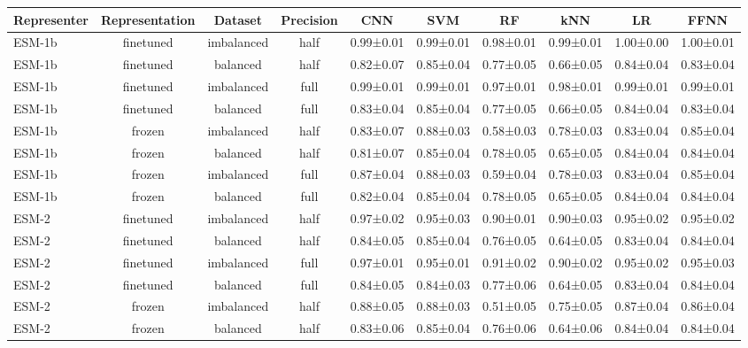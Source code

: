 \begin{tabular}{lccccccccc}
\toprule
 \textbf{Representer} & \textbf{Representation} &    \textbf{Dataset} & \textbf{Precision} &       \textbf{CNN} &       \textbf{SVM} &        \textbf{RF} &       \textbf{kNN} &        \textbf{LR} &      \textbf{FFNN} \\
\midrule
      ESM-1b &      finetuned & imbalanced &      half & 0.99±0.01 & 0.99±0.01 & 0.98±0.01 & 0.99±0.01 & 1.00±0.00 & 1.00±0.01 \\
      ESM-1b &      finetuned &   balanced &      half & 0.82±0.07 & 0.85±0.04 & 0.77±0.05 & 0.66±0.05 & 0.84±0.04 & 0.83±0.04 \\
      ESM-1b &      finetuned & imbalanced &      full & 0.99±0.01 & 0.99±0.01 & 0.97±0.01 & 0.98±0.01 & 0.99±0.01 & 0.99±0.01 \\
      ESM-1b &      finetuned &   balanced &      full & 0.83±0.04 & 0.85±0.04 & 0.77±0.05 & 0.66±0.05 & 0.84±0.04 & 0.83±0.04 \\
      ESM-1b &         frozen & imbalanced &      half & 0.83±0.07 & 0.88±0.03 & 0.58±0.03 & 0.78±0.03 & 0.83±0.04 & 0.85±0.04 \\
      ESM-1b &         frozen &   balanced &      half & 0.81±0.07 & 0.85±0.04 & 0.78±0.05 & 0.65±0.05 & 0.84±0.04 & 0.84±0.04 \\
      ESM-1b &         frozen & imbalanced &      full & 0.87±0.04 & 0.88±0.03 & 0.59±0.04 & 0.78±0.03 & 0.83±0.04 & 0.85±0.04 \\
      ESM-1b &         frozen &   balanced &      full & 0.82±0.04 & 0.85±0.04 & 0.78±0.05 & 0.65±0.05 & 0.84±0.04 & 0.84±0.04 \\
       ESM-2 &      finetuned & imbalanced &      half & 0.97±0.02 & 0.95±0.03 & 0.90±0.01 & 0.90±0.03 & 0.95±0.02 & 0.95±0.02 \\
       ESM-2 &      finetuned &   balanced &      half & 0.84±0.05 & 0.85±0.04 & 0.76±0.05 & 0.64±0.05 & 0.83±0.04 & 0.84±0.04 \\
       ESM-2 &      finetuned & imbalanced &      full & 0.97±0.01 & 0.95±0.01 & 0.91±0.02 & 0.90±0.02 & 0.95±0.02 & 0.95±0.03 \\
       ESM-2 &      finetuned &   balanced &      full & 0.84±0.05 & 0.84±0.03 & 0.77±0.06 & 0.64±0.05 & 0.83±0.04 & 0.84±0.04 \\
       ESM-2 &         frozen & imbalanced &      half & 0.88±0.05 & 0.88±0.03 & 0.51±0.05 & 0.75±0.05 & 0.87±0.04 & 0.86±0.04 \\
       ESM-2 &         frozen &   balanced &      half & 0.83±0.06 & 0.85±0.04 & 0.76±0.06 & 0.64±0.06 & 0.84±0.04 & 0.84±0.04 \\

\end{tabular}

